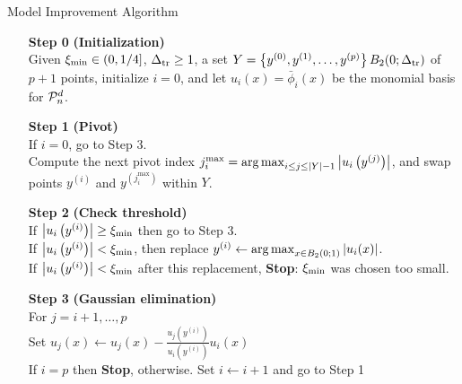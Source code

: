 \documentclass{article}
\begin{document}
{
\begin{fullwidth}[leftmargin=0in, rightmargin=0in, width=\linewidth-0.5in]
\begin{flushleft}

\begin{algorithm}[H]
    \caption{Model Improvement Algorithm \label{alg:model_improvement} }
    \label{model_improving_algorithm}
    \begin{itemize}
        \item[\textbf{Step 0}] \textbf{(Initialization)} \\
            Given $\xi_{\text{min}} \in (0,1/4]$, $\Delta_{\textrm{tr}} \ge 1$, a set $Y = \left\{y^{(0)}, y^{(1)}, \ldots, y^{(p)}\right\}  B_2(0;\Delta_{\textrm{tr}})$ of $p+1$ points,
            initialize $i=0$, and let $u_i(x)= \bar \phi_i(x)$ be the monomial basis for $\mathcal{P}^d_n$.
		\item[\textbf{Step 1}] \textbf{(Pivot)} \\
			If $i = 0$, go to Step 3. \\
			Compute the next pivot index $j^{\textrm{max}}_i = \operatorname*{arg\,max}_{i \le j \le |Y|-1} \left|u_i\left(y^{(j)}\right)\right|$,
			and swap points $y^{(i)}$ and $y^{(j^{\textrm{max}}_i)}$ within $Y$.
			
        \item[\textbf{Step 2}] \textbf{(Check threshold)} \\
                If $\left|u_i\left(y^{(i)}\right)\right| \ge \xi_{\text{min}}$ then go to Step 3. \\
                If $\left|u_i\left(y^{(i)}\right)\right| < \xi_{\text{min}}$, then replace $y^{(i)} \gets \operatorname*{arg\,max}_{x \in B_2\left(0; 1 \right)}\left|u_i(x)\right|$. \\
				If $\left|u_i\left(y^{(i)}\right)\right| < \xi_{\text{min}}$ after this replacement,  \textbf{Stop}: $\xi_{\text{min}}$ was chosen too small.
        \item[\textbf{Step 3}] \textbf{(Gaussian elimination)} \\
        	For $j = i+1, \ldots, p$ \\
        	\hspace{2em} Set $u_j(x) \gets u_j(x) - \frac{u_j\left(y^{(i)}\right)}{u_i\left(y^{(i)}\right)} u_i(x)$ \\
            If $i = p$ then \textbf{Stop}, otherwise.  Set $i \gets i+1$ and go to Step 1
    \end{itemize}
\end{algorithm}

\end{flushleft}
\end{fullwidth}
}
\end{document}
